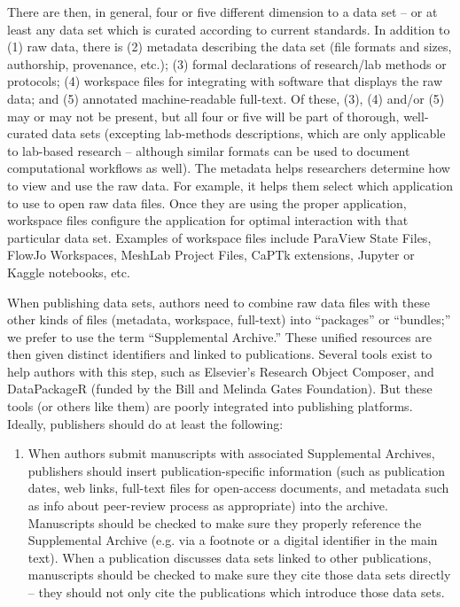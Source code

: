 \documentclass[11pt,letterpaper]{article}
\newcommand{\p}[1]{

\vspace{.7em}#1}
\newcommand{\q}[1]{{\fontfamily{qcr}\selectfont ``}#1{\fontfamily{qcr}\selectfont ''}}
\begin{document}
{\p{There are then, in general, four or five different dimension to a data set -- or at least any data set which is curated according to current standards.  In addition to (1) raw data, there is (2) metadata describing the data set (file formats and sizes, authorship, provenance, etc.); (3) formal declarations of research/lab methods or protocols; (4) workspace files for integrating with software that displays the raw data; and (5) annotated machine-readable full-text.  Of these, (3), (4) and/or (5) may or may not be present, but all four or five will be part of thorough, well-curated data sets (excepting lab-methods descriptions, which are only applicable to lab-based research -- although similar formats can be used to document computational workflows as well).  The metadata helps researchers determine how to view and use the raw data.  For example, it helps them select which application to use to open raw data files.  Once they are using the proper application, workspace files configure the application for optimal interaction with that particular data set.  Examples of workspace files include ParaView State Files, FlowJo Workspaces, MeshLab Project Files, CaPTk extensions, Jupyter or Kaggle notebooks, etc.}

\p{When publishing data sets, authors need to combine raw data files with these other kinds of files (metadata, workspace, full-text) into \q{packages} or \q{bundles;} we prefer to use the term \q{Supplemental Archive.} These unified resources are then given distinct identifiers and linked to publications.  Several tools exist to help authors with this step, such as Elsevier's Research Object Composer, and DataPackageR (funded by the Bill and Melinda Gates Foundation).  But these tools (or others like them) are poorly integrated into publishing platforms.  Ideally, publishers should do at least the following:

\begin{enumerate}
\item{}  When authors submit manuscripts with associated Supplemental Archives, publishers should insert publication-specific information (such as publication dates, web links, full-text files for open-access documents, and metadata such as info about peer-review process as appropriate) into the archive.  Manuscripts should be checked to make sure they properly reference the Supplemental Archive (e.g. via a footnote or a digital identifier in the main text).  When a publication discusses data sets linked to other publications, manuscripts should be checked to make sure they cite those data sets directly -- they should not only cite the publications which introduce those data sets.


\end{enumerate}}}
\end{document}
